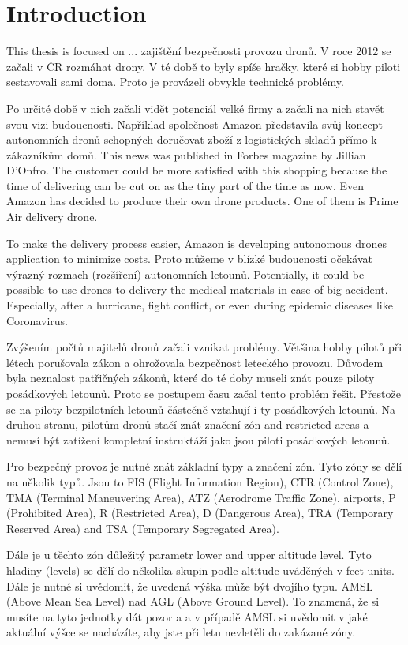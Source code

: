 \chapter{Introduction}\label{ch:introduction}
This thesis is focused on ... zajištění bezpečnosti provozu dronů.
V roce 2012 se začali v ČR rozmáhat drony.
V té době to byly spíše hračky, které si hobby piloti sestavovali sami doma.
Proto je provázeli obvykle technické problémy.

Po určité době v nich začali vidět potenciál velké firmy a začali na nich stavět svou vizi budoucnosti.
Například společnost Amazon představila svůj koncept autonomních dronů schopných doručovat zboží z logistických skladů přímo k zákazníkům domů.
This news was published in Forbes magazine by Jillian D'Onfro.\cite{amazonArticle}
The customer could be more satisfied with this shopping because the time of delivering can be cut on as the tiny part of the time as now.
Even Amazon has decided to produce their own drone products.
One of them is Prime Air delivery drone.

To make the delivery process easier, Amazon is developing autonomous drones application to minimize costs.
Proto můžeme v blízké budoucnosti očekávat výrazný rozmach (rozšíření) autonomních letounů.
Potentially, it could be possible to use drones to delivery the medical materials in case of big accident.
Especially, after a hurricane, fight conflict, or even during epidemic diseases like Coronavirus.

Zvýšením počtů majitelů dronů začali vznikat problémy.
Většina hobby pilotů při létech porušovala zákon a ohrožovala bezpečnost leteckého provozu.
Důvodem byla neznalost patřičných zákonů, které do té doby museli znát pouze piloty posádkových letounů.
Proto se postupem času začal tento problém řešit.
Přestože se na piloty bezpilotních letounů částečně vztahují i ty posádkových letounů.
Na druhou stranu, pilotům dronů stačí znát značení zón and restricted areas a nemusí být zatížení kompletní instruktáží jako jsou piloti posádkových letounů.

Pro bezpečný provoz je nutné znát základní typy a značení zón.
Tyto zóny se dělí na několik typů.
Jsou to FIS (Flight Information Region), CTR (Control Zone), TMA (Terminal Maneuvering Area), ATZ (Aerodrome Traffic Zone), airports, P (Prohibited Area), R (Restricted Area), D (Dangerous Area), TRA (Temporary Reserved Area) and TSA (Temporary Segregated Area).\cite{airspace}

Dále je u těchto zón důležitý parametr lower and upper altitude level.
Tyto hladiny (levels) se dělí do několika skupin podle altitude uváděných v feet units.
Dále je nutné si uvědomit, že uvedená výška může být dvojího typu.
AMSL (Above Mean Sea Level) nad AGL (Above Ground Level).
To znamená, že si musíte na tyto jednotky dát pozor a a v případě AMSL si uvědomit v jaké aktuální výšce se nacházíte, aby jste při letu nevletěli do zakázané zóny.

